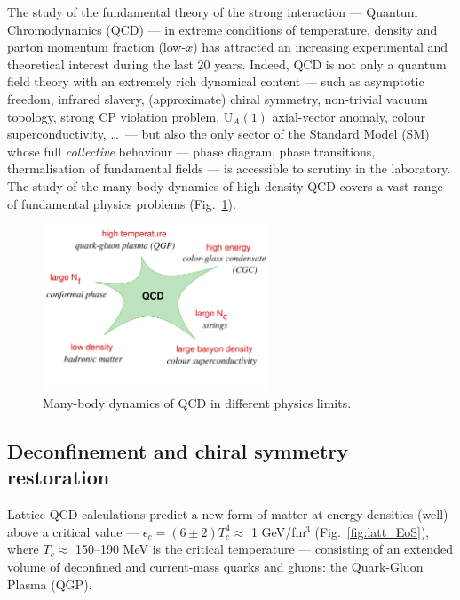 The study of the fundamental theory of the strong interaction --- Quantum Chromodynamics (QCD) ---
in extreme conditions of temperature, density and parton momentum fraction (low-$x$) has
attracted an increasing experimental and theoretical interest during the last 20 years. Indeed,
QCD is not only a quantum field theory with an extremely rich
dynamical content --- such as asymptotic freedom,
infrared slavery, (approximate) chiral symmetry, non-trivial vacuum topology, strong CP violation problem,
U$_A(1)$ axial-vector anomaly, colour superconductivity,
\ldots\ --- but also the only sector of the Standard Model (SM) whose full
{\it collective} behaviour --- phase diagram, phase transitions, thermalisation of fundamental fields ---
is accessible to scrutiny in the laboratory. The study of the many-body dynamics of high-density QCD
covers a vast range of fundamental physics problems (Fig.~\ref{fig:QCD_facets}).

\begin{figure}[htb]
\centering
\includegraphics[width=0.6\textwidth]{introduction/schaefer_qcd_phases}
\caption{Many-body dynamics of QCD in different physics limits.}
\label{fig:QCD_facets}
\end{figure}

\subsection*{Deconfinement and chiral symmetry restoration}

Lattice QCD calculations predict a new form of matter at energy densities
(well) above a critical value ---
$\epsilon_c =(6\pm 2) T_c^4 \approx$ 1 GeV/fm$^3$ (Fig.~\ref{fig:latt_EoS}),
where $T_c\approx$ 150--190 MeV is
the critical temperature --- consisting of an extended volume of deconfined and current-mass quarks
and gluons: the Quark-Gluon Plasma (QGP).


